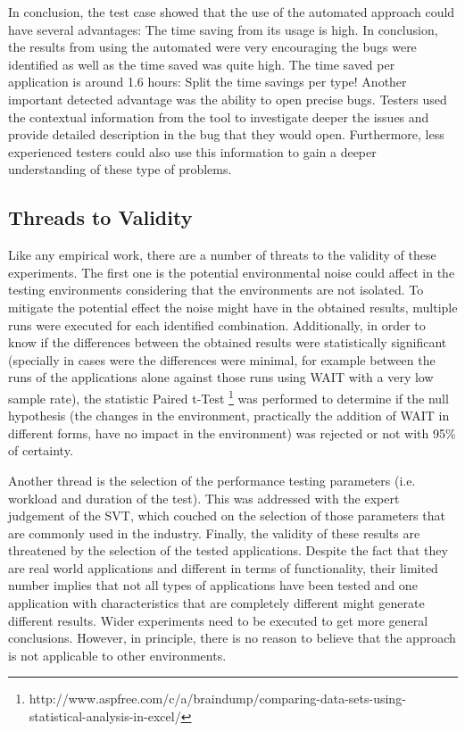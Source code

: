 \documentclass[runningheads,a4paper]{llncs}
\begin{document}
In conclusion, the test case showed that the use of the automated approach
could have several advantages: The time saving from its usage is high.
In conclusion, the results from using the automated were very encouraging the
bugs were identified as well as the time saved was quite high. The time saved per 
application is around 1.6 hours: Split the time savings per type! Another
important detected advantage was the ability to open precise bugs.
Testers used the contextual information from the tool to investigate deeper the
issues and provide detailed description in the bug that they would open.
Furthermore, less experienced testers could also use this information to gain a
deeper understanding of these type of problems.




\subsection{Threads to Validity}

Like any empirical work, there are a number of threats to the validity of these
experiments. The first one is the potential environmental noise could affect in
the testing environments considering that the environments are not isolated. To
mitigate the potential effect the noise might have in the obtained results, multiple runs 
were executed for each identified combination. Additionally, in order to know if
the differences between the obtained results were statistically significant (specially in cases 
were the differences were minimal, for example between the runs of the
applications alone against those runs using WAIT with a very low sample rate), the statistic Paired t-Test
\footnote{http://www.aspfree.com/c/a/braindump/comparing-data-sets-using-statistical-analysis-in-excel/}
was performed to determine if the null hypothesis (the changes in the
environment, practically the addition of WAIT in different forms, have no
impact in the environment) was rejected or not with 95\% of certainty.

Another thread is the selection of the performance testing parameters (i.e.
workload and duration of the test). This was addressed with the expert judgement 
of the SVT, which couched on the selection of those parameters that are
commonly used in the industry. Finally, the validity of these results are
threatened by the selection of the tested applications. Despite the fact that
they are real world applications and different in terms of functionality, their
limited number implies that not all types of applications have been tested and
one application with characteristics that are completely different might
generate different results. Wider experiments need to be executed to get more
general conclusions. However, in principle, there is no reason to believe that
the approach is not applicable to other environments.
\end{document}
